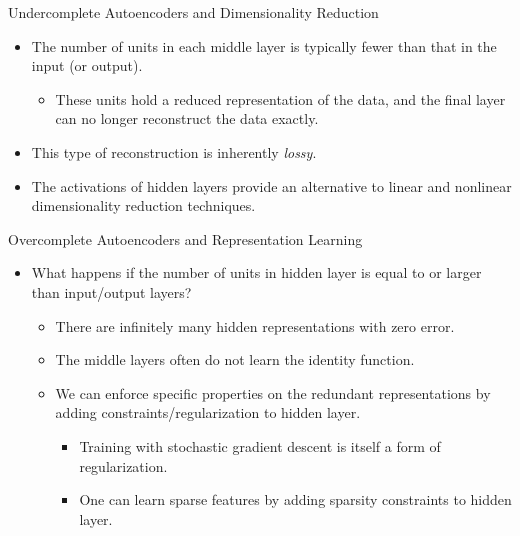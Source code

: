 \begin{frame}{Undercomplete Autoencoders and Dimensionality
Reduction}
\begin{itemize}
\item The number of units in each middle layer is typically fewer than that in the
input (or output). \begin{itemize} \item These  units hold a reduced
representation of the data, and the final layer can no longer
reconstruct the data exactly.
\end{itemize}
 \item This type of reconstruction
is inherently {\em lossy}.
\item The activations of hidden layers provide an alternative to
linear and nonlinear dimensionality reduction techniques.
\end{itemize}
\end{frame}


\begin{frame}{Overcomplete Autoencoders and Representation Learning}
\begin{itemize}
\item  What happens if the number of units in hidden layer is equal
to or larger than  input/output layers?
\begin{itemize}
\item There are infinitely many  hidden representations with zero error.
\item  The middle layers often do not learn the identity
function.
\item We can  enforce specific properties on
the redundant representations by adding constraints/regularization
to hidden layer.
\begin{itemize}
\item Training with stochastic gradient descent is itself a form of
regularization.
\item One can learn sparse features by adding sparsity constraints to hidden layer.
\end{itemize}
\end{itemize}
\end{itemize}
\end{frame}


